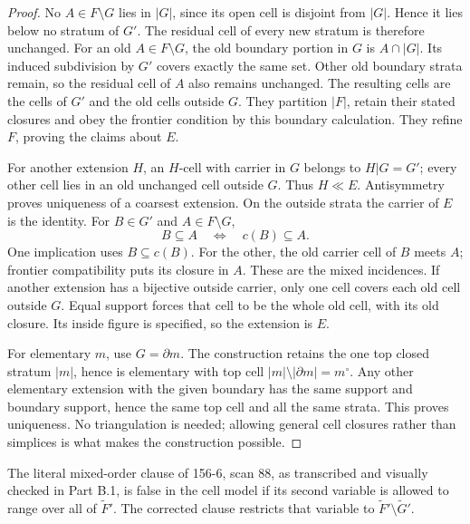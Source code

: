 \begin{proof}
No \(A\in F\setminus G\) lies in \(|G|\),
since its open cell is disjoint from \(|G|\).
Hence it lies below no stratum of \(G'\).
The residual cell of every new stratum
is therefore unchanged. For an old
\(A\in F\setminus G\), the old boundary
portion in \(G\) is \(A\cap|G|\).
Its induced subdivision by \(G'\)
covers exactly the same set.
Other old boundary strata remain,
so the residual cell of \(A\)
also remains unchanged.
The resulting cells are the
cells of \(G'\) and the old
cells outside \(G\).
They partition \(|F|\), retain
their stated closures and obey
the frontier condition by this
boundary calculation. They
refine \(F\), proving the claims
about \(E\).

For another extension \(H\),
an \(H\)-cell with carrier
in \(G\) belongs to \(H|G=G'\);
every other cell lies in an
old unchanged cell outside
\(G\). Thus \(H\ll E\).
Antisymmetry proves uniqueness
of a coarsest extension.
On the outside strata the
carrier of \(E\) is the
identity. For \(B\in G'\)
and \(A\in F\setminus G\),
\[
 B\subseteq A\quad\Longleftrightarrow\quad c(B)\subseteq A.
\]
One implication uses \(B\subseteq c(B)\).
For the other, the old carrier
cell of \(B\) meets \(A\);
frontier compatibility puts
its closure in \(A\).
These are the mixed incidences.
If another extension has a
bijective outside carrier,
only one cell covers each
old cell outside \(G\).
Equal support forces that
cell to be the whole old
cell, with its old closure.
Its inside figure is specified,
so the extension is \(E\).

For elementary \(m\), use
\(G=\partial m\).
The construction retains
the one top closed stratum
\(|m|\), hence is elementary
with top cell
\(|m|\setminus|\partial m|=m^\circ\).
Any other elementary extension
with the given boundary has
the same support and boundary
support, hence the same top
cell and all the same strata.
This proves uniqueness.
No triangulation is needed;
allowing general cell closures
rather than simplices is
what makes the construction
possible.
\end{proof}

\begin{counterexample}\label{SA21-BM-14bis-reading}
The literal mixed-order clause of 156-6, scan 88,
as transcribed and visually checked in Part B.1,
is false in the cell model if its second variable
is allowed to range over all of \(\widetilde F'\).
The corrected clause restricts that variable
to \(\widetilde F'\setminus\widetilde G'\).
\end{counterexample}

